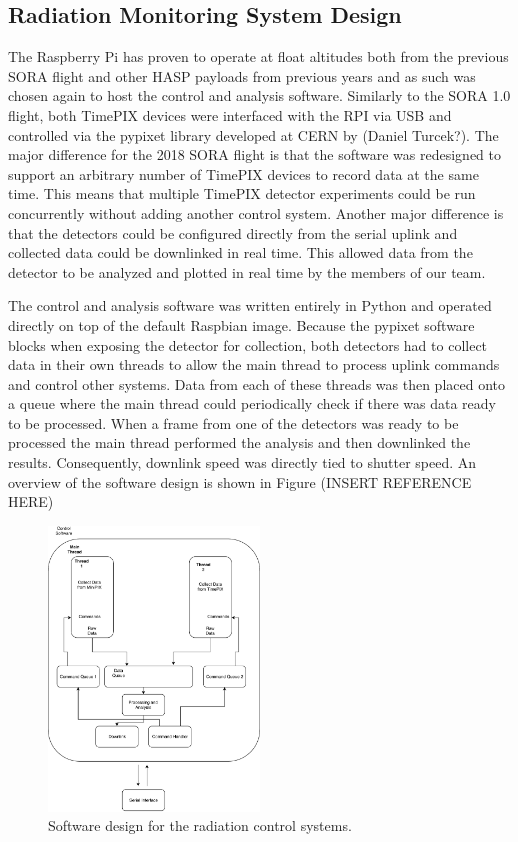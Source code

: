 \subsection{Radiation Monitoring System Design}
\label{sec:Radiation Design}
The Raspberry Pi has proven to operate at float altitudes both from the previous SORA flight and other HASP payloads from previous years and as such was chosen again to host the control and analysis software. Similarly to the SORA 1.0 flight, both TimePIX devices were interfaced with the RPI via USB and controlled via the pypixet library developed at CERN by (Daniel Turcek?). The major difference for the 2018 SORA flight is that the software was redesigned to support an arbitrary number of TimePIX devices to record data at the same time. This means that multiple TimePIX detector experiments could be run concurrently without adding another control system. Another major difference is that the detectors could be configured directly from the serial uplink and collected data could be downlinked in real time. This allowed data from the detector to be analyzed and plotted in real time by the members of our team.

The control and analysis software was written entirely in Python and operated directly on top of the default Raspbian image. Because the pypixet software blocks when exposing the detector for collection, both detectors had to collect data in their own threads to allow the main thread to process uplink commands and control other systems. Data from each of these threads was then placed onto a queue where the main thread could periodically check if there was data ready to be processed. When a frame from one of the detectors was ready to be processed the main thread performed the analysis and then downlinked the results. Consequently, downlink speed was directly tied to shutter speed. An overview of the software design is shown in Figure (INSERT REFERENCE HERE)

\begin{figure}[h!]
	\begin{center}
	\includegraphics[width=0.5\textwidth]{figures/SoftwareDesign.pdf}
	\caption{Software design for the radiation control systems.}
	\label{fig:softwaredesign}
	\end{center}
\end{figure}
\clearpage
 
